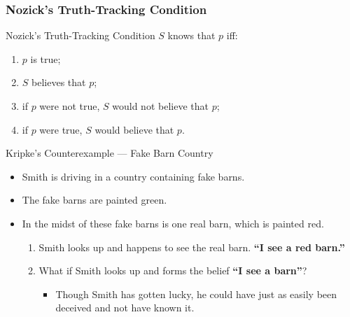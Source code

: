 \documentclass[UTF8,11pt,colorlinks,compress,openany]{beamer}%
\begin{document}
\begin{frame}\frametitle{Nozick's Truth-Tracking Condition}
\begin{block}{Nozick's Truth-Tracking Condition}
$S$ knows that $p$ iff:
\begin{enumerate}
	\item $p$ is true;
	\item $S$ believes that $p$;
	\item if $p$ were not true, $S$ would not believe that $p$;
	\item if $p$ were true, $S$ would believe that $p$.
\end{enumerate}
\end{block}
\begin{block}{Kripke's Counterexample --- Fake Barn Country}
\begin{itemize}
	\item Smith is driving in a country containing fake barns.
	\item The fake barns are painted green.
	\item In the midst of these fake barns is one real barn, which is painted red.
	\begin{enumerate}
	\item Smith looks up and happens to see the real barn. \textbf{``I see a red barn.''}
	\item What if Smith looks up and forms the belief \textbf{``I see a barn''}?
	\begin{itemize}
	\item Though Smith has gotten lucky, he could have just as easily been deceived and not have known it.
	\end{itemize}
	\end{enumerate}
\end{itemize}		
\end{block}
\end{frame}
\end{document}
